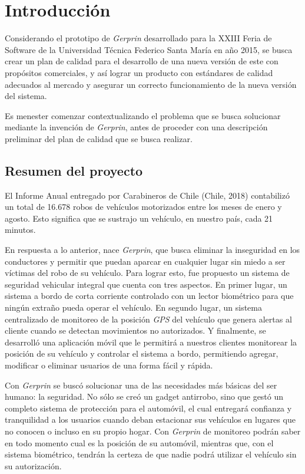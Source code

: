 
\chapter{Introducción}
Considerando el prototipo de \textit{Gerprin} desarrollado para la XXIII Feria de Software de la Universidad Técnica Federico Santa María en año 2015, se busca crear un plan de calidad para el desarrollo de una nueva versión de este con propósitos comerciales, y así lograr un producto con estándares de calidad adecuados al mercado y asegurar un correcto funcionamiento de la nueva versión del sistema.

Es menester comenzar contextualizando el problema que se busca solucionar mediante la invención de \textit{Gerprin}, antes de proceder con una descripción preliminar del plan de calidad que se busca realizar. 

\section{Resumen del proyecto}

El Informe Anual entregado por Carabineros de Chile (Chile, 2018) contabilizó un total de 16.678 robos de vehículos motorizados entre los meses de enero y agosto. Esto significa que se sustrajo un vehículo, en nuestro país, cada 21 minutos.

En respuesta a lo anterior, nace \textit{Gerprin}, que busca eliminar la inseguridad en los conductores y permitir que puedan aparcar en cualquier lugar sin miedo a ser víctimas del robo de su vehículo. Para lograr esto, fue propuesto un sistema de seguridad vehicular integral que cuenta con tres aspectos. En primer lugar, un sistema a bordo de corta corriente controlado con un lector biométrico para que ningún extraño pueda operar el vehículo. En segundo lugar, un sistema centralizado de monitoreo de la posición \textit{GPS} del vehículo que genera alertas al cliente cuando se detectan movimientos no autorizados. Y finalmente, se desarrolló una aplicación móvil que le permitirá a nuestros clientes monitorear la posición de su vehículo y controlar el sistema a bordo, permitiendo agregar, modificar o eliminar usuarios de una forma fácil y rápida.

Con \textit{Gerprin} se buscó solucionar una de las necesidades más básicas del ser humano: la seguridad. No sólo se creó un gadget antirrobo, sino que gestó un completo sistema de protección para el automóvil, el cual entregará confianza y tranquilidad a los usuarios cuando deban estacionar sus vehículos en lugares que no conocen o incluso en su propio hogar. Con \textit{Gerprin} de monitoreo podrán saber en todo momento cual es la posición de su automóvil, mientras que, con el sistema biométrico, tendrán la certeza de que nadie podrá utilizar el vehículo sin su autorización.

